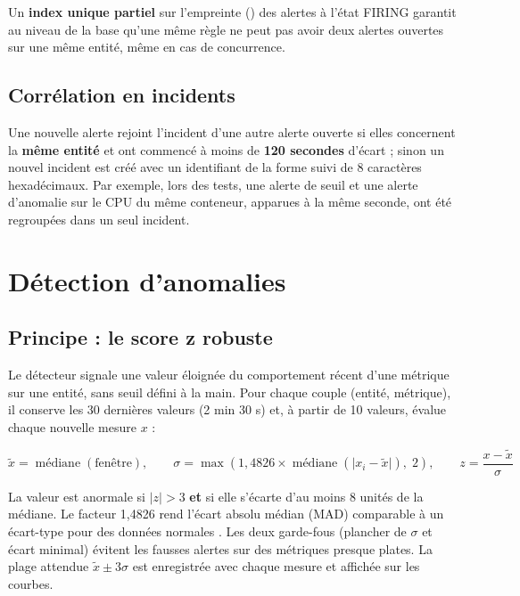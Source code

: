 Un \textbf{index unique partiel} sur l'empreinte () des alertes à
l'état FIRING garantit au niveau de la base qu'une même règle ne peut pas avoir deux alertes
ouvertes sur une même entité, même en cas de concurrence.

\subsection{Corrélation en incidents}

Une nouvelle alerte rejoint l'incident d'une autre alerte ouverte si elles concernent la
\textbf{même entité} et ont commencé à moins de \textbf{120 secondes} d'écart ; sinon un nouvel
incident est créé avec un identifiant de la forme  suivi de 8 caractères
hexadécimaux. Par exemple, lors des tests, une alerte de seuil et une alerte d'anomalie sur le
CPU du même conteneur, apparues à la même seconde, ont été regroupées dans un seul incident.

\section{Détection d'anomalies}

\subsection{Principe : le score z robuste}

Le détecteur signale une valeur éloignée du comportement récent d'une métrique sur une entité,
sans seuil défini à la main. Pour chaque couple (entité, métrique), il conserve les 30 dernières
valeurs (2 min 30 s) et, à partir de 10 valeurs, évalue chaque nouvelle mesure $x$ :

\begin{equation}
  \tilde{x} = \operatorname{médiane}(\text{fenêtre}), \qquad
  \sigma = \max\!\left(1{,}4826 \times \operatorname{médiane}\left(\lvert x_i - \tilde{x}\rvert\right),\; 2\right), \qquad
  z = \frac{x - \tilde{x}}{\sigma}
\end{equation}

La valeur est anormale si $\lvert z \rvert > 3$ \textbf{et} si elle s'écarte d'au moins 8 unités
de la médiane. Le facteur 1,4826 rend l'écart absolu médian (MAD) comparable à un écart-type
pour des données normales \cite{leys2013,iglewicz1993}. Les deux garde-fous (plancher de
$\sigma$ et écart minimal) évitent les fausses alertes sur des métriques presque plates. La
plage attendue $\tilde{x} \pm 3\sigma$ est enregistrée avec chaque mesure et affichée sur les
courbes.

